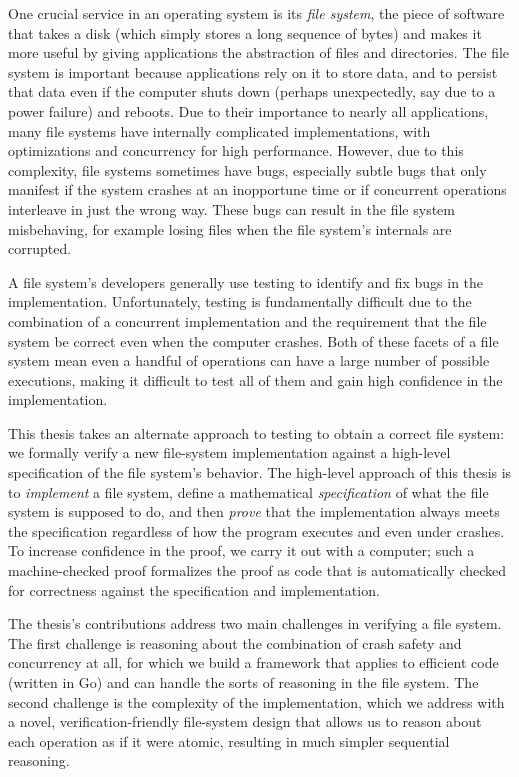 One crucial service in an operating system is its \emph{file system}, the piece
of software that takes a disk (which simply stores a long sequence of bytes) and
makes it more useful by giving applications the abstraction of files and directories. The file
system is important because applications rely on it to store data, and to
persist that data even if the computer shuts down (perhaps unexpectedly, say due
to a power failure) and reboots. Due to their importance to nearly all applications, many
file systems have internally complicated implementations, with optimizations and
concurrency for high performance. However, due to this complexity, file systems
sometimes have bugs, especially subtle bugs that only manifest if the system
crashes at an inopportune time or if concurrent operations interleave in just
the wrong way. These bugs can result in the file system misbehaving, for example
losing files when the file system's internals are corrupted.

A file system's developers generally use testing to identify and fix bugs in the
implementation. Unfortunately, testing is fundamentally difficult due to the
combination of a concurrent implementation and the requirement that the file
system be correct even when the computer crashes. Both of these facets of a file
system mean even a handful of operations can have a large number of possible
executions, making it difficult to test all of them and gain high confidence in the
implementation.

This thesis takes an alternate approach to testing to obtain a correct file
system: we formally verify a new file-system implementation against a high-level
specification of the file system's behavior. The high-level approach of this
thesis is to \emph{implement} a file system, define a mathematical
\emph{specification} of what the file system is supposed to do, and then
\emph{prove} that the implementation always meets the specification regardless
of how the program executes and even under crashes. To increase confidence in
the proof, we carry it out with a computer; such a machine-checked proof
formalizes the proof as code that is automatically checked
for correctness against the specification and implementation.

The thesis's contributions address two main challenges in verifying a file system. The
first challenge is reasoning about the combination of crash safety and
concurrency at all, for which we build a framework that applies to efficient
code (written in Go) and can handle the sorts of reasoning in the file system.
The second challenge is the complexity of the implementation, which we address
with a novel, verification-friendly file-system design that allows us to reason
about each operation as if it were atomic, resulting in much simpler sequential reasoning.

